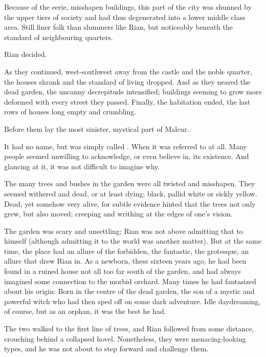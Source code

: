 Because of the eerie, misshapen buildings, this part of the city was shunned by the upper tiers of society and had thus degenerated into a lower middle class area. Still finer folk than slummers like Rian, but noticeably beneath the standard of neighbouring quarters. 

 Rian decided. 

As they continued, west-southwest away from the castle and the noble quarter, the houses shrank and the standard of living dropped. And as they neared the dead garden, the uncanny decrepitude intensified; buildings seeming to grow more deformed with every street they passed. Finally, the habitation ended, the last rows of houses long empty and crumbling. 

Before them lay the most sinister, mystical part of Malcur. 

It had no name, but was simply called . When it was referred to at all. Many people seemed unwilling to acknowledge, or even believe in, its existence. And glancing at it, it was not difficult to imagine why. 

The many trees and bushes in the garden were all twisted and misshapen. They seemed withered and dead, or at least dying; \coloured black, pallid white or sickly yellow. Dead, yet somehow very alive, for subtle evidence hinted that the trees not only grew, but also moved; creeping and writhing at the edges of one's vision. 

The garden was scary and unsettling; Rian was not above admitting that to himself (although admitting it to the world was another matter). But at the same time, the place had an allure of the forbidden, the fantastic, the grotesque, an allure that drew Rian in. As a newborn, these sixteen years ago, he had been found in a ruined house not all too far south of the garden, and had always imagined some connection to the morbid orchard. Many times he had fantasized about his origin: Born in the centre of the dead garden, the son of a mystic and powerful witch who had then sped off on some dark adventure. Idle daydreaming, of course, but as an orphan, it was the best he had. 

The two \scathae{} walked to the first line of trees, and Rian followed from some distance, crouching behind a collapsed hovel. 
Nonetheless, they were menacing-looking types, and he was not about to step forward and challenge them. 

